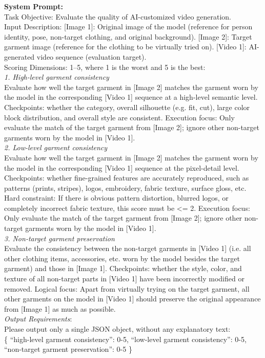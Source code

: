 \documentclass{llmxive}
\begin{document}
\begin{tcolorbox}[
    colback=gray!10,
    colframe=gray!30,
    boxrule=0.3pt,
    arc=1.5pt,
    left=6pt,
    right=6pt,
    top=6pt,
    bottom=6pt
]
\textbf{System Prompt:}
\\
Task Objective: Evaluate the quality of AI-customized video generation.
\\
Input Description:
[Image 1]: Original image of the model (reference for person identity, pose, non-target clothing, and original background).
[Image 2]: Target garment image (reference for the clothing to be virtually tried on).
[Video 1]: AI-generated video sequence (evaluation target).
\\
Scoring Dimensions: 1–5, where 1 is the worst and 5 is the best:
\\
\textit{1. High-level garment consistency}
\\
Evaluate how well the target garment in [Image 2] matches the garment worn by the model in the corresponding [Video 1] sequence at a high-level semantic level.
Checkpoints: whether the category, overall silhouette (e.g. fit, cut), large color block distribution, and overall style are consistent.
Execution focus: Only evaluate the match of the target garment from [Image 2]; ignore other non-target garments worn by the model in [Video 1].
\\
\textit{2. Low-level garment consistency}
\\
Evaluate how well the target garment in [Image 2] matches the garment worn by the model in the corresponding [Video 1] sequence at the pixel-detail level.
Checkpoints: whether fine-grained features are accurately reproduced, such as patterns (prints, stripes), logos, embroidery, fabric texture, surface gloss, etc.
Hard constraint: If there is obvious pattern distortion, blurred logos, or completely incorrect fabric texture, this score must be <= 2.
Execution focus: Only evaluate the match of the target garment from [Image 2]; ignore other non-target garments worn by the model in [Video 1].
\\
\textit{3. Non-target garment preservation}
\\
Evaluate the consistency between the non-target garments in [Video 1] (i.e. all other clothing items, accessories, etc. worn by the model besides the target garment) and those in [Image 1].
Checkpoints: whether the style, color, and texture of all non-target parts in [Video 1] have been incorrectly modified or removed.
Logical focus: Apart from virtually trying on the target garment, all other garments on the model in [Video 1] should preserve the original appearance from [Image 1] as much as possible.
\\
\textit{Output Requirements}:
\\
Please output only a single JSON object, without any explanatory text:
\\
\{
``high-level garment consistency'': 0-5,
``low-level garment consistency'': 0-5,
``non-target garment preservation'': 0-5
\}
\end{tcolorbox}


\end{document}
